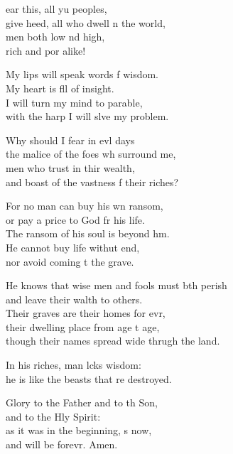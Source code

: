 \settowidth{\versewidth}{He knows that wise men and fools must both perish *}
\begin{psalmverse}%
  \begin{patverse}
ear this, all yu peoples,\Med\\
give heed, all who dwell \pointup{\i}n the world,\\
men both low nd high,\Med\\
rich and por alike!

My lips will speak words f wisdom.\Med\\
My heart is fll of insight.\\
I will turn my mind to  parable,\Med\\
with the harp I will slve my problem.

Why should I fear in ev\pointup{\i}l days\Med\\
the malice of the foes wh surround me,\\
men who trust in thir wealth,\Med\\
and boast of the vastness f their riches?

For no man can buy his wn ransom,\Med\\
or pay a price to God fr his life.\\
The ransom of his soul is beyond h\pointup{\i}m.\Flex\\
He cannot buy life withut end,\Med\\
nor avoid coming t the grave.

He knows that wise men and fools must bth perish\Med\\
and leave their walth to others.\\
Their graves are their homes for evr,\Flex\\
their dwelling place from age t age,\Med\\
though their names spread wide thrugh the land.

In his riches, man lcks wisdom:\Med\\
he is like the beasts that re destroyed.

Glory to the Father and to th Son,\Med\\
and to the Hly Spirit:\\
as it was in the beginning, \pointup{\i}s now,\Med\\
and will be forevr. Amen. 
  \end{patverse}
\end{psalmverse}
